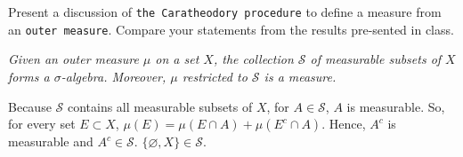 \documentclass[12pt]{article}
\newenvironment{exercise}[1]{\begin{tcolorbox}[colback=black!15, colframe=black!80, breakable, title=#1]}{\end{tcolorbox}}
\newenvironment{solution}{\begin{tcolorbox}[colback=white, colframe=black!50, breakable, title=Solution. ]\setlength{\parskip}{0.8em}}{\end{tcolorbox}}
\begin{document}
    \begin{exercise}{7}
        Present a discussion of \texttt{the Caratheodory procedure} to define a measure from an \texttt{outer measure}. Compare your statements from the results pre-sented in class. 
    \end{exercise}

    \begin{solution}
        \emph{Given an outer measure $\mu$ on a set $X$, the collection $\mathscr{S}$ of measurable subsets of $X$ forms a $\sigma$-algebra. Moreover, $\mu$ restricted to $\mathscr{S}$ is a measure.}

        Because $\mathscr{S}$ contains all measurable subsets of $X$, for $A\in\mathscr{S}$, $A$ is measurable. So, for every set $E\subset X$, $\mu(E)=\mu(E\cap A)+\mu(E^c\cap A)$. Hence, $A^c$ is measurable and $A^c\in\mathscr{S}$. $\{\varnothing, X\}\in\mathscr{S}$. 


\end{solution}
\end{document}
